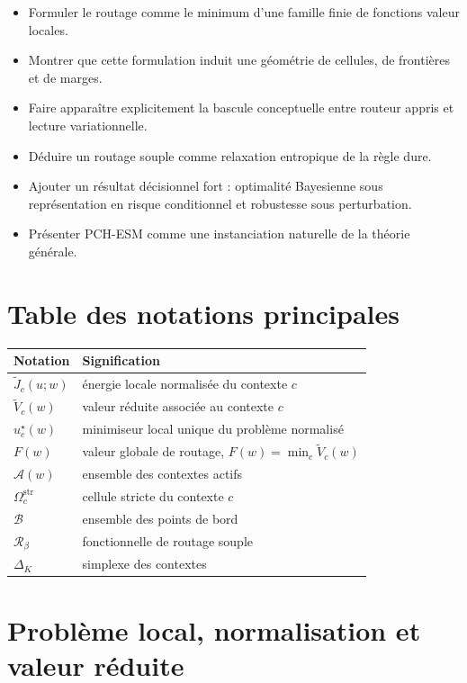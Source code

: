 \documentclass[11pt,a4paper]{article}
\newcommand{\Rcal}{\mathcal R}
\newcommand{\Acal}{\mathcal A}
\newcommand{\Bcal}{\mathcal B}
\begin{document}
\begin{itemize}[leftmargin=2em]
    \item Formuler le routage comme le minimum d'une famille finie de fonctions valeur locales.
    \item Montrer que cette formulation induit une géométrie de cellules, de frontières et de marges.
    \item Faire apparaître explicitement la bascule conceptuelle entre routeur appris et lecture variationnelle.
    \item Déduire un routage souple comme relaxation entropique de la règle dure.
    \item Ajouter un résultat décisionnel fort : optimalité Bayesienne sous représentation en risque conditionnel et robustesse sous perturbation.
    \item Présenter PCH-ESM comme une instanciation naturelle de la théorie générale.
\end{itemize}

\section*{Table des notations principales}
\begin{center}
\begin{tabular}{@{}ll@{}}
\toprule
Notation & Signification \\ \midrule
\(\widetilde J_c(u;w)\) & énergie locale normalisée du contexte \(c\) \\
\(\widetilde V_c(w)\) & valeur réduite associée au contexte \(c\) \\
\(u_c^\star(w)\) & minimiseur local unique du problème normalisé \\
\(F(w)\) & valeur globale de routage, \(F(w)=\min_c \widetilde V_c(w)\) \\
\(\Acal(w)\) & ensemble des contextes actifs \\
\(\Omega_c^{\mathrm{str}}\) & cellule stricte du contexte \(c\) \\
\(\Bcal\) & ensemble des points de bord \\
\(\Rcal_\beta\) & fonctionnelle de routage souple \\
\(\Delta_K\) & simplexe des contextes \\
\bottomrule
\end{tabular}
\end{center}

\section{Problème local, normalisation et valeur réduite}
\end{document}
